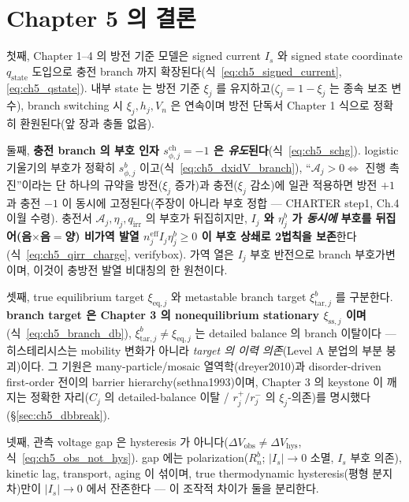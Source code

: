 \documentclass[11pt,a4paper]{article}
\newcommand{\eff}{\mathrm{eff}}
\newcommand{\eq}{\mathrm{eq}}
\newcommand{\irr}{\mathrm{irr}}
\newcommand{\chg}{\mathrm{ch}}
\newcommand{\hys}{\mathrm{hys}}
\newcommand{\obs}{\mathrm{obs}}
\newcommand{\tar}{\mathrm{tar}}
\newcommand{\stt}{\mathrm{state}}
\newcommand{\sstat}{\mathrm{ss}}
\begin{document}
\section{Chapter 5 의 결론}\label{sec:ch5_concl}
첫째, Chapter 1--4 의 방전 기준 모델은 signed current $I_s$ 와 signed state coordinate $q_\stt$ 도입으로 충전
branch 까지 확장된다(식~\eqref{eq:ch5_signed_current},\allowbreak\eqref{eq:ch5_qstate}). 내부 state 는 방전
기준 $\xi_j$ 를 유지하고($\zeta_j=1-\xi_j$ 는 종속 보조 변수), branch switching 시 $\xi_j,h_j,V_n$ 은 연속이며
방전 단독서 Chapter 1 식으로 정확히 환원된다(앞 장과 충돌 없음).

둘째, \textbf{충전 branch 의 부호 인자 $s_{\phi,j}^\chg=-1$ 은 \emph{유도}된다}(식~\eqref{eq:ch5_schg}). logistic
기울기의 부호가 정확히 $s_{\phi,j}^b$ 이고(식~\eqref{eq:ch5_dxidV_branch}), ``$\mathcal A_j>0\Leftrightarrow$
진행 촉진''이라는 단 하나의 규약을 방전($\xi_j$ 증가)과 충전($\xi_j$ 감소)에 일관 적용하면 방전 $+1$ 과 충전
$-1$ 이 동시에 고정된다(주장이 아니라 부호 정합 — CHARTER step1, Ch.4 이월 수령). 충전서 $\mathcal A_j,\eta_j,
q_\irr$ 의 부호가 뒤집히지만, \textbf{$I_j$ 와 $\eta_j^b$ 가 \emph{동시에} 부호를 뒤집어(음$\times$음$=$양)
비가역 발열 $n_j^{\eff}I_j\eta_j^b\ge0$ 이 부호 상쇄로 2법칙을 보존}한다(식~\eqref{eq:ch5_qirr_charge}, verifybox).
가역 열은 $I_j$ 부호 반전으로 branch 부호가변이며, 이것이 충방전 발열 비대칭의 한 원천이다.

셋째, true equilibrium target $\xi_{\eq,j}$ 와 metastable branch target $\xi_{\tar,j}^b$ 를 구분한다.
\textbf{branch target 은 Chapter 3 의 nonequilibrium stationary $\xi_{\sstat,j}$ 이며}(식~\eqref{eq:ch5_branch_db}),
$\xi_{\tar,j}^b\ne\xi_{\eq,j}$ 는 detailed balance 의 branch 이탈이다 — 히스테리시스는 mobility 변화가 아니라
\emph{target 의 이력 의존}(Level A 분업의 부분 붕괴)이다. 그 기원은 many-particle/mosaic 열역학(dreyer2010)과
disorder-driven first-order 전이의 barrier hierarchy(sethna1993)이며, Chapter 3 의 keystone 이 깨지는 정확한
자리($C_j$ 의 detailed-balance 이탈 / $r_j^+/r_j^-$ 의 $\xi_j$-의존)를 명시했다(\S\ref{sec:ch5_dbbreak}).

넷째, 관측 voltage gap 은 hysteresis 가 아니다(\textbf{$\Delta V_\obs\ne\Delta V_\hys$}, 식~\eqref{eq:ch5_obs_not_hys}).
gap 에는 polarization($R_n^b$; $|I_s|\to0$ 소멸, $I_s$ 부호 의존), kinetic lag, transport, aging 이 섞이며,
true thermodynamic hysteresis(평형 분지 차)만이 $|I_s|\to0$ 에서 잔존한다 — 이 조작적 차이가 둘을 분리한다.
\end{document}
